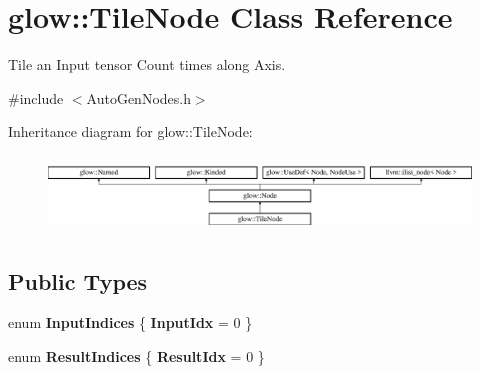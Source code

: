 \hypertarget{classglow_1_1_tile_node}{}\section{glow\+:\+:Tile\+Node Class Reference}
\label{classglow_1_1_tile_node}


Tile an Input tensor Count times along Axis.  




{\ttfamily \#include $<$Auto\+Gen\+Nodes.\+h$>$}

Inheritance diagram for glow\+:\+:Tile\+Node\+:\begin{figure}[H]
\begin{center}
\leavevmode
\includegraphics[height=2.028986cm]{classglow_1_1_tile_node}
\end{center}
\end{figure}
\subsection*{Public Types}
\begin{DoxyCompactItemize}
\item 
\mbox{\label{classglow_1_1_tile_node_a56d8bad1d165339850cbfa65b01907e2}} 
enum {\bfseries Input\+Indices} \{ {\bfseries Input\+Idx} = 0
 \}
\item 
\mbox{\label{classglow_1_1_tile_node_a0fc6385d8032475bad43aadf679e61ef}} 
enum {\bfseries Result\+Indices} \{ {\bfseries Result\+Idx} = 0
 \}
\end{DoxyCompactItemize}
